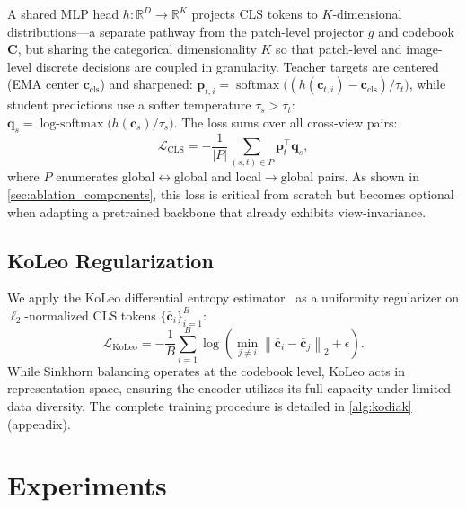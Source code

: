 \documentclass[runningheads]{llncs}
\DeclareMathOperator{\softmax}{softmax}
\DeclareMathOperator{\logsoftmax}{log\text{-}softmax}
\newcommand{\norm}[1]{\left\lVert #1 \right\rVert}
\begin{document}
A shared MLP head $h: \mathbb{R}^D \to \mathbb{R}^K$ projects CLS tokens to $K$-dimensional distributions---a separate pathway from the patch-level projector $g$ and codebook $\mathbf{C}$, but sharing the categorical dimensionality $K$ so that patch-level and image-level discrete decisions are coupled in granularity.
Teacher targets are centered (EMA center $\mathbf{c}_{\text{cls}}$) and sharpened:
$\mathbf{p}_{t,i} = \softmax\!\bigl((h(\mathbf{c}_{t,i}) - \mathbf{c}_{\text{cls}})/\tau_t\bigr)$,
while student predictions use a softer temperature $\tau_s > \tau_t$:
$\mathbf{q}_{s} = \logsoftmax\!\bigl(h(\mathbf{c}_{s})/\tau_s\bigr)$.
The loss sums over all cross-view pairs:
\begin{equation}
    \mathcal{L}_{\text{CLS}} = -\frac{1}{|P|}\sum_{(s,t) \in P} \mathbf{p}_t^\top \mathbf{q}_s,
    \label{eq:cls_loss}
\end{equation}
where $P$ enumerates global$\leftrightarrow$global and local$\to$global pairs.
As shown in \cref{sec:ablation_components}, this loss is critical from scratch but becomes optional when adapting a pretrained backbone that already exhibits view-invariance.

\subsection{KoLeo Regularization}
\label{sec:koleo}

We apply the KoLeo differential entropy estimator~\cite{sablayrolles2019spreading} as a uniformity regularizer on $\ell_2$-normalized CLS tokens $\{\bar{\mathbf{c}}_i\}_{i=1}^B$:
\begin{equation}
    \mathcal{L}_{\text{KoLeo}} =
    -\frac{1}{B} \sum_{i=1}^{B} \log \!\left( \min_{j \neq i} \norm{\bar{\mathbf{c}}_i - \bar{\mathbf{c}}_j}_2 + \epsilon \right).
\end{equation}
While Sinkhorn balancing operates at the codebook level, KoLeo acts in representation space, ensuring the encoder utilizes its full capacity under limited data diversity.
The complete training procedure is detailed in \cref{alg:kodiak} (appendix).


\section{Experiments}
\label{sec:experiments}
\end{document}
